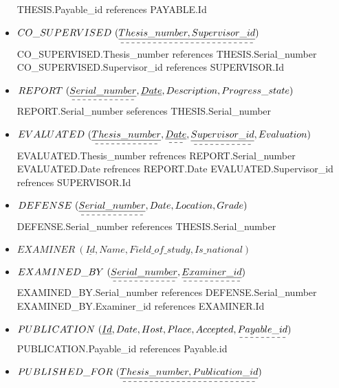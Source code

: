 \documentclass[a4paper]{article}
\begin{document}
\begin{itemize}
    \newline THESIS.Payable\_id references PAYABLE.Id
    \newline
\item$CO\_SUPERVISED \ (\dashuline{\underline{Thesis\_number,Supervisor\_id}})$
    \newline CO\_SUPERVISED.Thesis\_number references THESIS.Serial\_number
    \newline CO\_SUPERVISED.Supervisor\_id references SUPERVISOR.Id 
\newline        
\item$ REPORT \ (\dashuline{\underline{Serial\_number}}, \underline{Date}, Description, Progress\_state)$
    \newline REPORT.Serial\_number seferences THESIS.Serial\_number
\newline    
\item$EVALUATED \ (\dashuline{\underline{Thesis\_number}}, \dashuline{\underline{Date}}, \dashuline{\underline{Supervisor\_id}}, Evaluation)$
    \newline EVALUATED.Thesis\_number refrences  REPORT.Serial\_number
    \newline EVALUATED.Date refrences REPORT.Date
    \newline EVALUATED.Supervisor\_id refrences SUPERVISOR.Id 
\newline    
\item$DEFENSE \ (\dashuline{\underline{Serial\_number}}, Date , Location , Grade )$
    \newline DEFENSE.Serial\_number references THESIS.Serial\_number
   \newline
\item$EXAMINER \ (\underline{Id}, Name , Field\_of\_study , Is\_national)$
\newline
\item$ EXAMINED\_BY \ (\dashuline{\underline{Serial\_number}}, \dashuline{\underline{Examiner\_id}})$
    \newline EXAMINED\_BY.Serial\_number references DEFENSE.Serial\_number
    \newline EXAMINED\_BY.Examiner\_id references EXAMINER.Id
\newline
\item$ PUBLICATION \ (\underline{Id}, Date, Host, Place, Accepted, \dashuline{Payable\_id})$
    \newline PUBLICATION.Payable\_id references Payable.id 
\newline  
\item$ PUBLISHED\_FOR\ (\dashuline{\underline{Thesis\_number,Publication\_id}})$  

\end{itemize}
\end{document}
